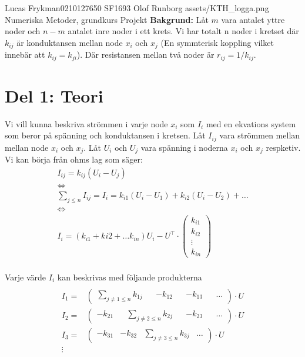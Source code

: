 \documentclass{assignment}
\begin{document}
\assignmentTitle
{Lucas Frykman}{0210127650}
{SF1693}
{Olof Runborg}
{assets/KTH_logga.png}
{Numeriska Metoder, grundkurs}
{Projekt}
\textbf{Bakgrund:} Låt $m$ vara antalet yttre noder och $n-m$ antalet inre noder i ett krets. Vi har totalt n noder i kretset
där $k_{ij}$ är konduktansen mellan node $x_i$ och $x_j$ (En symmterisk koppling vilket innebär att $k_{ij}=k_{ji}$). Där resistansen mellan två noder är $r_{ij}=1/k_{ij}$.
\section*{Del 1: Teori}
Vi vill kunna beskriva strömmen i varje node $x_{i}$ som $I_{i}$ med en ekvations system som beror på spänning och konduktansen i kretsen.
Låt $I_{ij}$ vara strömmen mellan mellan node $x_i$ och $x_j$. Låt $U_{i}$ och $U_{j}$ vara spänning i noderna $x_{i}$ och $x_j$ respketiv.
Vi kan börja från ohms lag som säger:
\begin{align}
    I_{ij} = k_{ij}(U_i-U_j) \label{An2}
    \\ \nonumber \Longleftrightarrow 
    \\ \nonumber \sum_{j\leq n}I_{ij} = I_i = k_{i1}(U_i-U_1) + 
    k_{i2}(U_i-U_2) + \dots \label{An3}
    \\ \nonumber \Longleftrightarrow
    \\ I_i = (k_{i1}+k{i2}+\dots k_{in})U_i - U^\top \cdot 
    \begin{pmatrix}
        k_{i1}
        \\ k_{i2}
        \\ \vdots
        \\ k_{in}
    \end{pmatrix}
\end{align}
\\ Varje värde $I_i$ kan beskrivas med följande produkterna
\begin{align*}
    \\ I_1 = &
    \begin{pmatrix}
        \sum_{j\neq 1 \leq n} k_{1j} && -k_{12} &&  -k_{13} && \dots 
    \end{pmatrix} \cdot U 
    \\ I_2 = &
    \begin{pmatrix}
        -k_{21} && \sum_{j\neq 2 \leq n} k_{2j} &&  -k_{23} && \dots
    \end{pmatrix} \cdot U 
    \nonumber
    \\ I_3 = &
    \begin{pmatrix}
        -k_{31} & -k_{32} & \sum_{j\neq 3 \leq n} k_{3j} & \dots
    \end{pmatrix} \cdot U 
    \\ \vdots
\end{align*}
\end{document}
